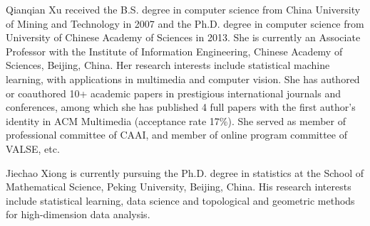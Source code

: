 \documentclass[10pt,journal,cspaper,compsoc]{IEEEtran}
\begin{document}
{%
\vspace{0cm}\begin{biography}{Qianqian Xu received the B.S. degree in computer science from China University of Mining and Technology in 2007 and the Ph.D. degree in computer science from University of Chinese Academy of Sciences in 2013. She is currently an Associate Professor with the Institute of Information Engineering, Chinese Academy of Sciences, Beijing, China. Her research interests include statistical machine learning, with applications in multimedia and computer vision. She has authored or coauthored 10+ academic papers in prestigious international journals and conferences, among which she has published 4 full papers with the first author's identity in ACM Multimedia (acceptance rate 17\%).  She served as member of professional committee of CAAI, and member of online program committee of VALSE, etc.}
\end{biography}

\vspace{0cm}\begin{biography}{Jiechao Xiong is currently pursuing the Ph.D. degree in statistics at the School of Mathematical Science, Peking University, Beijing, China. His research interests include statistical learning, data science and topological and geometric methods for high-dimension data analysis.}
\end{biography}

}
\end{document}
